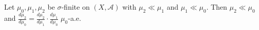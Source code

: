 Let $\mu_0, \mu_1, \mu_2$ be $\sigma$-finite on $(X, \mathcal{A})$ with $\mu_2 \ll \mu_1$ and $\mu_1 \ll \mu_0$. Then $\mu_2 \ll \mu_0$ and $\frac{d\mu_2}{d\mu_0} = \frac{d\mu_2}{d\mu_1} \cdot \frac{d\mu_1}{d\mu_0}$ $\mu_0$-a.e.
